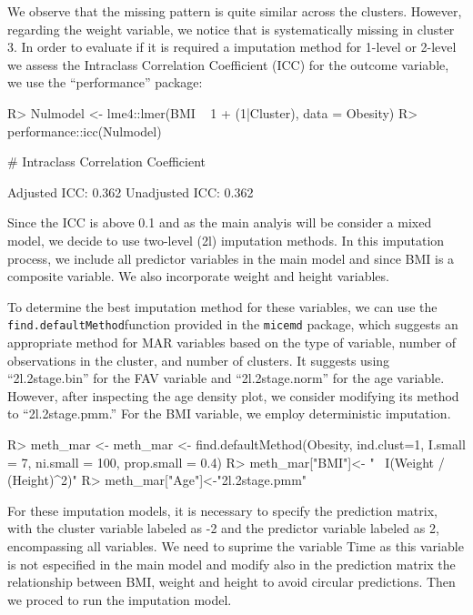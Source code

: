 \documentclass[
]{jss}
\begin{document}
We observe that the missing pattern is quite similar across the
clusters. However, regarding the weight variable, we notice that is
systematically missing in cluster 3. In order to evaluate if it is
required a imputation method for 1-level or 2-level we assess the
Intraclass Correlation Coefficient (ICC) for the outcome variable, we
use the ``performance'' package:

\begin{CodeChunk}
\begin{CodeInput}
R> Nulmodel <- lme4::lmer(BMI ~ 1 + (1|Cluster), data = Obesity)
R> performance::icc(Nulmodel)
\end{CodeInput}
\begin{CodeOutput}
# Intraclass Correlation Coefficient

    Adjusted ICC: 0.362
  Unadjusted ICC: 0.362
\end{CodeOutput}
\end{CodeChunk}

Since the ICC is above 0.1 and as the main analyis will be consider a
mixed model, we decide to use two-level (2l) imputation methods. In this
imputation process, we include all predictor variables in the main model
and since BMI is a composite variable. We also incorporate weight and
height variables.

To determine the best imputation method for these variables, we can use
the \texttt{find.defaultMethod}function provided in the \texttt{micemd}
package, which suggests an appropriate method for MAR variables based on
the type of variable, number of observations in the cluster, and number
of clusters. It suggests using ``2l.2stage.bin'' for the FAV variable
and ``2l.2stage.norm'' for the age variable. However, after inspecting
the age density plot, we consider modifying its method to
``2l.2stage.pmm.'' For the BMI variable, we employ deterministic
imputation.

\begin{CodeChunk}
\begin{CodeInput}
R> meth_mar <- meth_mar <- find.defaultMethod(Obesity, ind.clust=1, I.small = 7, ni.small = 100, prop.small = 0.4)
R> meth_mar["BMI"]<- "~ I(Weight / (Height)^2)"
R> meth_mar["Age"]<-"2l.2stage.pmm" 
\end{CodeInput}
\end{CodeChunk}

For these imputation models, it is necessary to specify the prediction
matrix, with the cluster variable labeled as -2 and the predictor
variable labeled as 2, encompassing all variables. We need to suprime
the variable Time as this variable is not especified in the main model
and modify also in the prediction matrix the relationship between BMI,
weight and height to avoid circular predictions. Then we proced to run
the imputation model.
\end{document}
